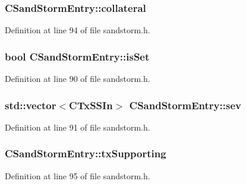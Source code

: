 \subsubsection[{collateral}]{ C\+Sand\+Storm\+Entry\+::collateral}\label{class_c_sand_storm_entry_a184e3999700add47aa0fa6d7968d8264}


Definition at line 94 of file sandstorm.\+h.

\hypertarget{class_c_sand_storm_entry_ad6a36c4a905189729bb33d4b9a4793a2}{}
\subsubsection[{is\+Set}]{\setlength{\rightskip}{0pt plus 5cm}bool C\+Sand\+Storm\+Entry\+::is\+Set}\label{class_c_sand_storm_entry_ad6a36c4a905189729bb33d4b9a4793a2}


Definition at line 90 of file sandstorm.\+h.

\hypertarget{class_c_sand_storm_entry_abad515f03d3c6a1caea06ac0582d46f5}{}
\subsubsection[{sev}]{\setlength{\rightskip}{0pt plus 5cm}std\+::vector$<${\bf C\+Tx\+S\+S\+In}$>$ C\+Sand\+Storm\+Entry\+::sev}\label{class_c_sand_storm_entry_abad515f03d3c6a1caea06ac0582d46f5}


Definition at line 91 of file sandstorm.\+h.

\hypertarget{class_c_sand_storm_entry_a85966c7316ba0642a58189e23f49daf5}{}
\subsubsection[{tx\+Supporting}]{ C\+Sand\+Storm\+Entry\+::tx\+Supporting}\label{class_c_sand_storm_entry_a85966c7316ba0642a58189e23f49daf5}


Definition at line 95 of file sandstorm.\+h.

\hypertarget{class_c_sand_storm_entry_a116f3b2ccbbd5958421dfdcce6a4f9c5}{}
